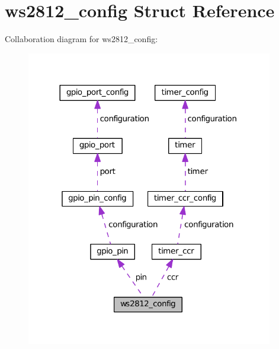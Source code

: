 \hypertarget{structws2812__config}{}\section{ws2812\+\_\+config Struct Reference}
\label{structws2812__config}


Collaboration diagram for ws2812\+\_\+config\+:\nopagebreak
\begin{figure}[H]
\begin{center}
\leavevmode
\includegraphics[width=305pt]{structws2812__config__coll__graph}
\end{center}
\end{figure}
